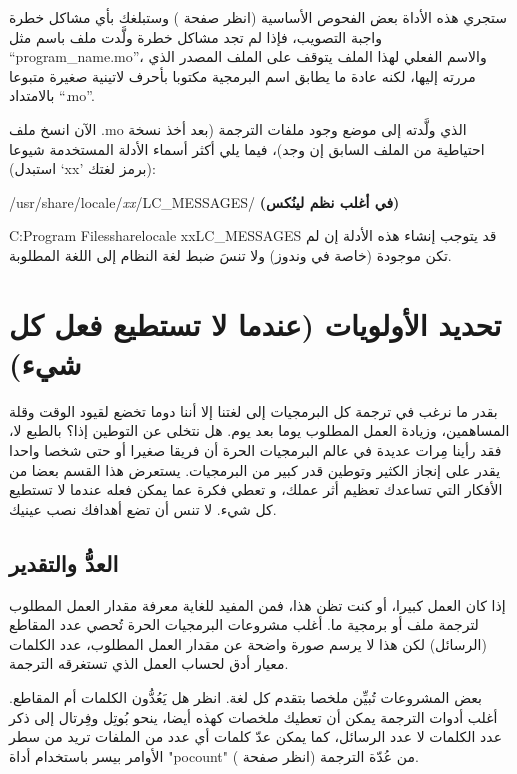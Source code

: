 ستجري هذه الأداة بعض الفحوص الأساسية (انظر صفحة
\at[ref:37415529]) وستبلغك بأي مشاكل خطرة واجبة التصويب، فإذا
لم تجد مشاكل خطرة ولَّدت ملف باسم مثل “program\_name.mo”، والاسم الفعلي
لهذا الملف يتوقف على الملف المصدر الذي مررته إليها، لكنه عادة ما يطابق
اسم البرمجية مكتوبا بأحرف لاتينية صغيرة متبوعا بالامتداد “‪.mo‬”.

الآن انسخ ملف ‪.mo‬ الذي ولَّدته إلى موضع وجود ملفات الترجمة (بعد أخذ
نسخة احتياطية من الملف السابق إن وجد)، فيما يلي أكثر أسماء الأدلة
المستخدمة شيوعا (استبدل ‘xx’ برمز لغتك):

\startitemize[1]
\item /usr/share/locale/{\it xx}/LC\_MESSAGES/ {\bf (في أغلب نظم
لينُكس)}
\item C: Program Files share locale
xx LC\_MESSAGES
\stopitemize
قد يتوجب إنشاء هذه الأدلة إن لم تكن موجودة (خاصة في وندوز) ولا تنسَ ضبط
لغة النظام إلى اللغة المطلوبة.

\section[ref:36383525]{تحديد الأولويات (عندما لا تستطيع فعل كل شيء)}
بقدر ما نرغب في ترجمة كل البرمجيات
إلى لغتنا إلا أننا دوما تخضع لقيود الوقت وقلة المساهمين، وزيادة العمل
المطلوب يوما بعد يوم. هل نتخلى عن التوطين إذا؟ بالطبع لا، فقد رأينا
مِرات عديدة في عالم البرمجيات الحرة أن فريقا صغيرا أو حتى شخصا واحدا
يقدر على إنجاز الكثير وتوطين قدر كبير من البرمجيات. يستعرض هذا القسم
بعضا من الأفكار التي تساعدك تعظيم أثر عملك، و تعطي فكرة عما يمكن فعله
عندما لا تستطيع كل شيء. لا تنس أن تضع أهدافك نصب عينيك.

\subsection[ref:33531520]{العدُّ والتقدير}
إذا كان العمل كبيرا، أو كنت تظن
هذا، فمن المفيد للغاية معرفة مقدار العمل المطلوب لترجمة ملف أو برمجية
ما. أغلب مشروعات البرمجيات الحرة تُحصي عدد المقاطع (الرسائل) لكن هذا لا
يرسم صورة واضحة عن مقدار العمل المطلوب، عدد الكلمات معيار أدق لحساب
العمل الذي تستغرقه الترجمة.

بعض المشروعات تُبيِّن ملخصا بتقدم كل لغة. انظر هل يَعُدُّون الكلمات أم
المقاطع. أغلب أدوات الترجمة يمكن أن تعطيك ملخصات كهذه أيضا، ينحو بُوتِل
وفِرتال إلى ذكر عدد الكلمات لا عدد الرسائل، كما يمكن عدّ كلمات أي عدد
من الملفات تريد من سطر الأوامر بيسر باستخدام أداة "pocount" من عُدّة
الترجمة (انظر صفحة \at[ref:20165030]). 


